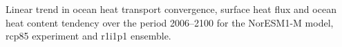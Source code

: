 \label{fig:noresm_full}
Linear trend in ocean heat transport convergence, surface heat flux and ocean heat content tendency over the period 2006--2100 for the NorESM1-M model, rcp85 experiment and r1i1p1 ensemble.